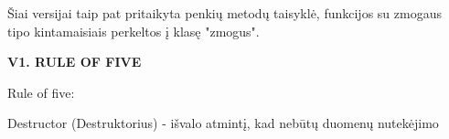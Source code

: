 Šiai versijai taip pat pritaikyta penkių metodų taisyklė, funkcijos su zmogaus tipo kintamaisiais perkeltos į klasę "{}zmogus"{}.

{\bfseries{V1. RULE OF FIVE}}

Rule of five\+:


\begin{DoxyEnumerate}
\item Destructor (Destruktorius) -\/ išvalo atmintį, kad nebūtų duomenų nutekėjimo
\end{DoxyEnumerate}


\begin{DoxyCode}{0}
\DoxyCodeLine{\}}

\end{DoxyCode}

